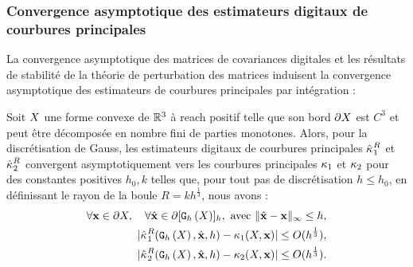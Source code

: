\subsubsection{Convergence asymptotique des estimateurs digitaux de courbures principales}
%
La convergence asymptotique des matrices de covariances digitales et les
résultats de stabilité de la théorie de perturbation des matrices induisent la
convergence asymptotique des estimateurs de courbures principales par
intégration :
%
\begin{theorem}{}
\label{thm:multigrid-convergence-curv-k1k2}
%
  Soit $X$ une forme convexe de $\mathbb{R}^3$ à reach positif telle que son bord
  $\partial X$ est $C^3$ et peut être décomposée en nombre fini de parties monotones.
  Alors, pour la discrétisation de Gauss, les estimateurs digitaux de courbures
  principales $\hat{\kappa_{}}_{1}^{R}$ et $\hat{\kappa_{}}_{2}^{R}$ convergent
  asymptotiquement vers les courbures principales $\kappa_{1}$ et
  $\kappa_{2}$ pour des constantes positives $h_0,
  k$ telles que, pour tout pas de discrétisation $h \le h_0$, en définissant le
  rayon de la boule $R = kh^{\frac{1}{3}}$, nous avons :
  \begin{align}
     \forall \mathbf{x} \in \partial X, \quad \forall \hat{\mathbf{x}} \in \partial \lbrack \mathtt{G}_{h}\left(X\right) \rbrack_{h}, \text{~avec~} \| \hat{\mathbf{x}} -\mathbf{x}\|_\infty \le h,\nonumber\\
     | \hat{\kappa_{}}_{1}^{R}(\mathtt{G}_{h}\left(X\right),\hat{\mathbf{x}},h) - \kappa_{1}(X,\mathbf{x}) | \le O(h^{\frac{1}{3}}) ,\\
     | \hat{\kappa_{}}_{2}^{R}(\mathtt{G}_{h}\left(X\right),\hat{\mathbf{x}},h) - \kappa_{2}(X,\mathbf{x}) | \le O(h^{\frac{1}{3}}) .
  \end{align}
\end{theorem}
